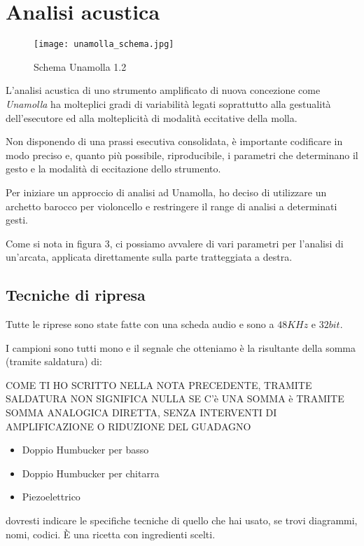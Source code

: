 \section{Analisi acustica}

\begin{figure}[t]
\centering
\texttt{[image: unamolla\_schema.jpg]}
\caption{Schema Unamolla 1.2}
\label{fig:03_unamolla_02}
\end{figure}

L’analisi acustica di uno strumento amplificato di nuova concezione come
\emph{Unamolla} ha molteplici gradi di variabilità legati soprattutto alla
gestualità dell’esecutore ed alla molteplicità di modalità eccitative della molla.

Non disponendo di una prassi esecutiva consolidata, è importante codificare in
modo preciso e, quanto più possibile, riproducibile, i parametri che determinano
il gesto e la modalità di eccitazione dello strumento.

Per iniziare un approccio di analisi ad Unamolla, ho deciso di utilizzare un
archetto barocco per violoncello e restringere il range di analisi a determinati
gesti.

Come si nota in figura 3, ci possiamo avvalere di vari parametri per l’analisi
di un'arcata, applicata direttamente sulla parte tratteggiata a destra.

\subsection{Tecniche di ripresa}

Tutte le riprese sono state fatte con una scheda audio e sono a $48KHz$ e $32bit$.

I campioni sono tutti mono e il segnale che otteniamo è la risultante della somma
(tramite saldatura) di:

\Large{\color{red} COME TI HO SCRITTO NELLA NOTA PRECEDENTE, TRAMITE SALDATURA NON SIGNIFICA NULLA SE C'è UNA SOMMA è TRAMITE SOMMA ANALOGICA DIRETTA, SENZA INTERVENTI DI AMPLIFICAZIONE O RIDUZIONE DEL GUADAGNO}

\begin{itemize}
  \item{Doppio Humbucker per basso}
  \item{Doppio Humbucker per chitarra}
  \item{Piezoelettrico}
\end{itemize}
\Large{\color{red} dovresti indicare le specifiche tecniche di quello che hai usato, se trovi diagrammi, nomi, codici. È una ricetta con ingredienti scelti.}

